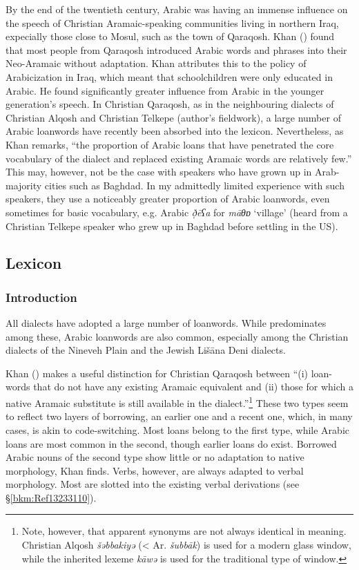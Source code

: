 \documentclass[output=paper]{langsci/langscibook}
\begin{document}
By the end of the twentieth century, Arabic was having an immense influence on the speech of Christian Aramaic-speaking communities living in northern Iraq, expecially those close to Mosul, such as the town of Qaraqosh. Khan (\citeyear[9]{Khan2002}) found that most people from Qaraqosh introduced Arabic words and phrases into their Neo-Aramaic without adaptation.  Khan attributes this to the policy of Arabicization in Iraq, which meant that schoolchildren were only educated in Arabic. He found significantly greater influence from Arabic in the younger generation’s speech. In Christian Qaraqosh, as in the neighbouring dialects of Christian Alqosh and Christian Telkepe (author’s fieldwork), a large number of Arabic {loanwords} have recently been absorbed into the lexicon. Nevertheless, as Khan remarks, “the proportion of Arabic loans that have penetrated the {core vocabulary} of the dialect and replaced existing Aramaic words are relatively few.” This may, however, not be the case with speakers who have grown up in Arab-majority cities such as Baghdad. In my admittedly limited experience with such speakers, they use a noticeably greater proportion of Arabic {loanwords}, even sometimes for basic vocabulary, e.g.  Arabic \textit{ð̣ēʕa} for \textit{māθɒ} ‘village’ (heard from a Christian Telkepe speaker who grew up in Baghdad before settling in the US).

\subsection{Lexicon}
\subsubsection{\label{bkm:Ref13232790}Introduction}

All  dialects have adopted a large number of {loanwords}. While  predominates among these, Arabic {loanwords} are also common, especially among the Christian dialects of the Nineveh Plain and the Jewish Lišāna Deni dialects.

 Khan (\citeyear[516]{Khan2002}) makes a useful distinction for Christian Qaraqosh between “(i) loan-words that do not have any existing Aramaic equivalent and (ii) those for which a native Aramaic substitute is still available in the dialect.”\footnote{Note, however, that apparent synonyms are not always identical in meaning. Christian Alqosh \textit{šəbbakiyə} (< Ar. \textit{šubbāk}) is used for a modern glass window, while the inherited lexeme \textit{kāwə} is used for the traditional type of window.} These two types seem to reflect two layers of borrowing, an earlier one and a recent one, which, in many cases, is akin to {code-switching}. Most  loans belong to the first type, while Arabic loans are most common in the second, though earlier loans do exist. Borrowed Arabic nouns of the second type show little or no adaptation to native morphology, Khan finds. Verbs, however, are always adapted to  verbal morphology. Most are slotted into the existing  verbal derivations (see §\ref{bkm:Ref13233110}).
\end{document}
